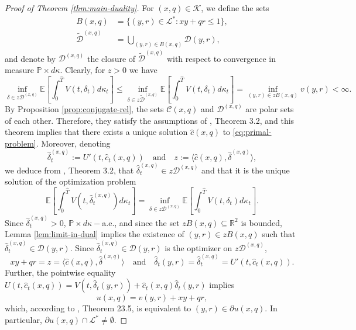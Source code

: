 \documentclass[11pt, oneside]{article}   	%
\theoremstyle{plain}
\theoremstyle{definition}
\theoremstyle{remark}
\begin{document}
\begin{proof}[Proof of Theorem \ref{thm:main-duality}]
For $(x,q)\in\mathcal{K}$, we define the sets
\begin{equation*}
\begin{aligned}
B(x,q)&=\{(y,r)\in\mathcal{L}^*: xy+qr\leq 1\},\\
\tilde{\mathcal{D}}^{(x,q)}&=\bigcup_{(y,r)\in B(x,q)}\mathcal{D}(y,r),
\end{aligned}
\end{equation*}
and denote by $\mathcal{D}^{(x,q)}$ the closure of $\tilde{\mathcal{D}}^{(x,q)}$ with respect to convergence in measure $\mathbb{P}\times d\kappa$. Clearly, for $z>0$ we have
$$\inf_{\delta\in z\mathcal{D}^{(x,q)}}\mathbb{E}\left[\int_0^{\hat{T}} V(t,\delta_t)d\kappa_t\right]\leq \inf_{\delta\in z\tilde{\mathcal{D}}^{(x,q)}}\mathbb{E}\left[\int_0^{\hat{T}} V(t,\delta_t)d\kappa_t\right]=\inf_{(y,r)\in zB(x,q)}v(y,r)<\infty.$$
By Proposition \ref{prop:conjugate-rel}, the sets $\mathcal{C}(x,q)$ and $\mathcal{D}^{(x,q)}$ are polar sets of each other. Therefore, they satisfy the assumptions of \cite{mostovyi}, Theorem 3.2, and this theorem implies that there exists a unique solution $\hat{c}(x,q)$ to \eqref{eq:primal-problem}. Moreover, denoting
$$\hat{\delta}_t^{(x,q)}:=U'(t,\hat{c}_t(x,q))\quad\text{and}\quad z:=\langle \hat{c}(x,q),\hat{\delta}^{(x,q)}\rangle,$$
we deduce from \cite{mostovyi}, Theorem 3.2, that $\hat{\delta}_t^{(x,q)}\in z\mathcal{D}^{(x,q)}$ and that it is the unique solution of the optimization problem
$$\mathbb{E}\left[\int_0^{\hat{T}} V(t,\hat{\delta}_t^{(x,q)})d\kappa_t\right]=\inf_{\delta\in z\mathcal{D}^{(x,q)}}\mathbb{E}\left[\int_0^{\hat{T}} V(t,\delta_t)d\kappa_t\right].$$
Since $\hat{\delta}_t^{(x,q)}>0$, $\mathbb{P}\times d\kappa-$a.e., and since the set $zB(x,q)\subseteq\mathbb{R}^2$ is bounded, Lemma \ref{lem:limit-in-dual} implies the existence of $(y,r)\in zB(x,q)$ such that $\hat{\delta}_t^{(x,q)}\in\mathcal{D}(y,r)$. Since $\hat{\delta}_t^{(x,q)}\in\mathcal{D}(y,r)$ is the optimizer on $z\mathcal{D}^{(x,q)}$,
$$xy+qr=z=\langle \hat{c}(x,q),\hat{\delta}^{(x,q)}\rangle\quad\text{and}\quad \hat{\delta}_t(y,r)=\hat{\delta}_t^{(x,q)}=U'(t,\hat{c}_t(x,q)).$$
Further, the pointwise equality $U(t,\hat{c}_t(x,q))=V(t,\hat{\delta}_t(y,r))+\hat{c}_t(x,q)\hat{\delta}_t(y,r)$ implies
\begin{equation}\label{eq:equality}
u(x,q)=v(y,r)+xy+qr,
\end{equation}
which, according to \cite{rockafellar}, Theorem 23.5, is equivalent to $(y,r)\in\partial u(x,q)$. In particular, $\partial u(x,q)\cap\mathcal{L}^*\neq\emptyset$.


\end{proof}
\end{document}
